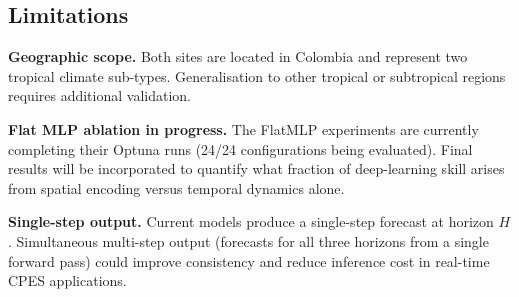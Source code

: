 \subsection{Limitations}

\textbf{Geographic scope.} Both sites are located in Colombia and represent
two tropical climate sub-types. Generalisation to other tropical or subtropical
regions requires additional validation.

\textbf{Flat MLP ablation in progress.} The FlatMLP experiments are currently
completing their Optuna runs (24/24 configurations being evaluated). Final
results will be incorporated to quantify what fraction of deep-learning skill
arises from spatial encoding versus temporal dynamics alone.

\textbf{Single-step output.} Current models produce a single-step forecast at
horizon $H$. Simultaneous multi-step output (forecasts for all three horizons
from a single forward pass) could improve consistency and reduce inference cost
in real-time CPES applications.
